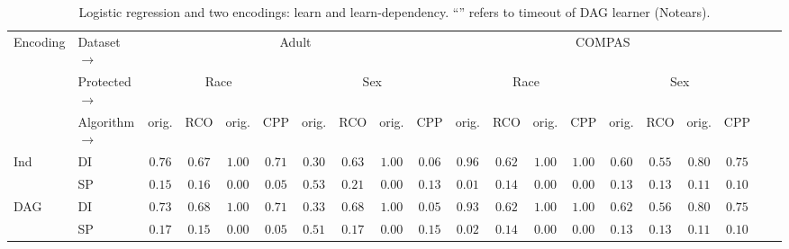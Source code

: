
\begin{table*}       
    \centering
        \setlength{\tabcolsep}{.2em}
            \begin{tabular}{ll
            				ccc
            				ccc
            				ccc
            				ccc
            				ccc
            				ccc}
                \toprule
                \multirow{3}{*}{Encoding}& Dataset $ \rightarrow $   & 
                \multicolumn{8}{c}{Adult} &
                \multicolumn{8}{c}{COMPAS} \\ 
                \cmidrule(lr){3-10}
                \cmidrule(lr){11-18}
                & Protected  $ \rightarrow $ & 
                \multicolumn{4}{c}{Race}   & \multicolumn{4}{c}{Sex}  &
                \multicolumn{4}{c}{Race}   & \multicolumn{4}{c}{Sex}
                \\ 
                \cmidrule(lr){3-6}
                \cmidrule(lr){7-10}
                \cmidrule(lr){11-14}
                \cmidrule(lr){15-18}

                 & Algorithm  $ \rightarrow $ &  
                orig. & RCO &
                orig. & CPP &
                orig. & RCO &
                orig. & CPP &
                orig. & RCO &
                orig. & CPP &
				orig. & RCO &
				orig. & CPP &
               \\
                \midrule
          
              
              
			Ind
			& DI&  $ 0.76 $ &  $ 0.67 $ &  $ 1.00 $ &  $ 0.71 $ &  $ 0.30 $ &  $ \mathbf{0.63} $ &  $ 1.00 $ &  $ 0.06 $ &  $ 0.96 $ &  $ 0.62 $ &  $ 1.00 $ &  $ \mathbf{1.00} $ &  $ 0.60 $ &  $ 0.55 $ &  $ 0.80 $ &  $ 0.75 $  \\
			& SP&  $ 0.15 $ &  $ 0.16 $ &  $ 0.00 $ &  $ 0.05 $ &  $ 0.53 $ &  $ \mathbf{0.21} $ &  $ 0.00 $ &  $ 0.13 $ &  $ 0.01 $ &  $ 0.14 $ &  $ 0.00 $ &  $ \mathbf{0.00} $ &  $ 0.13 $ &  $ \mathbf{0.13} $ &  $ 0.11 $ &  $ \mathbf{0.10} $  \\
			\midrule
			DAG
			& DI&  $ 0.73 $ &  $ 0.68 $ &  $ 1.00 $ &  $ 0.71 $ &  $ 0.33 $ &  $ \mathbf{0.68} $ &  $ 1.00 $ &  $ 0.05 $ &  $ 0.93 $ &  $ 0.62 $ &  $ 1.00 $ &  $ \mathbf{1.00} $ &  $ 0.62 $ &  $ 0.56 $ &  $ 0.80 $ &  $ 0.75 $  \\
			& SP&  $ 0.17 $ &  $ \mathbf{0.15} $ &  $ 0.00 $ &  $ 0.05 $ &  $ 0.51 $ &  $ \mathbf{0.17} $ &  $ 0.00 $ &  $ 0.15 $ &  $ 0.02 $ &  $ 0.14 $ &  $ 0.00 $ &  $ \mathbf{0.00} $ &  $ 0.13 $ &  $ \mathbf{0.13} $ &  $ 0.11 $ &  $ \mathbf{0.10} $  \\
			
			
               
            \bottomrule
    \end{tabular}
\caption{Logistic regression and two encodings: learn and learn-dependency. ``\textemdash'' refers to timeout of DAG learner (Notears). }
\end{table*}



